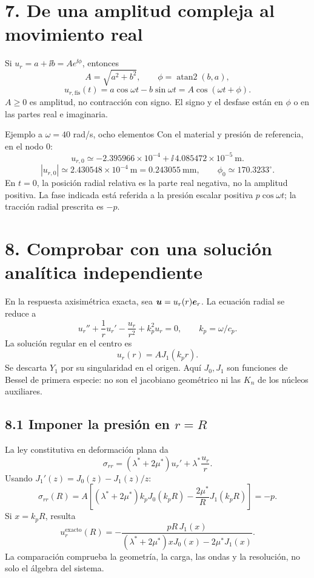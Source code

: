 \documentclass[11pt]{article}
\begin{document}
\section*{7. De una amplitud compleja al movimiento real}
Si \(u_r=a+\ii b=Ae^{\ii\phi}\), entonces
\[
 A=\sqrt{a^2+b^2},\qquad \phi=\operatorname{atan2}(b,a),
\]
\[
 \boxed{u_{r,\text{fís}}(t)=a\cos\omega t-b\sin\omega t
 =A\cos(\omega t+\phi).}
\]
\(A\ge0\) es amplitud, no contracción con signo. El signo y el desfase
están en \(\phi\) o en las partes real e imaginaria.

\begin{resultado}{Ejemplo a \(\omega=40\) rad/s, ocho elementos}
Con el material y presión de referencia, en el nodo 0:
\[
 u_{r,0}\simeq-2.395966\times10^{-4}
                +\ii\,4.085472\times10^{-5}\ \mathrm m.
\]
\[
 |u_{r,0}|\simeq2.430548\times10^{-4}\ \mathrm m
 =0.243055\ \mathrm{mm},\qquad
 \phi_0\simeq170.3233^\circ.
\]
En \(t=0\), la posición radial relativa es la parte real negativa,
no la amplitud positiva. La fase indicada está referida a la presión
escalar positiva \(p\cos\omega t\); la tracción radial prescrita es \(-p\).
\end{resultado}

\newpage
\section*{8. Comprobar con una solución analítica independiente}
En la respuesta axisimétrica exacta, sea
\(\bm{u}=u_r(r)\bm{e}_r\). La ecuación radial se reduce a
\[
 u_r''+\frac1r u_r'-\frac{u_r}{r^2}+k_p^2u_r=0,\qquad
 k_p=\omega/c_p.
\]
La solución regular en el centro es
\[
 u_r(r)=A J_1(k_pr).
\]
Se descarta \(Y_1\) por su singularidad en el origen.
Aquí \(J_0,J_1\) son funciones de Bessel de primera especie:
no son el jacobiano geométrico ni las \(K_n\) de los núcleos auxiliares.

\subsection*{8.1 Imponer la presión en \(r=R\)}
La ley constitutiva en deformación plana da
\[
 \sigma_{rr}=(\lambda^*+2\mu^*)u_r'
                  +\lambda^*\frac{u_r}{r}.
\]
Usando \(J_1'(z)=J_0(z)-J_1(z)/z\):
\[
 \sigma_{rr}(R)=A\left[
 (\lambda^*+2\mu^*)k_pJ_0(k_pR)-\frac{2\mu^*}{R}J_1(k_pR)
 \right]=-p.
\]
Si \(x=k_pR\), resulta
\[
 \boxed{u_r^{\mathrm{exacto}}(R)=
 -\frac{pR\,J_1(x)}
 {(\lambda^*+2\mu^*)xJ_0(x)-2\mu^*J_1(x)}.}
\]
La comparación comprueba la geometría, la carga, las ondas y la resolución,
no solo el álgebra del sistema.
\end{document}
